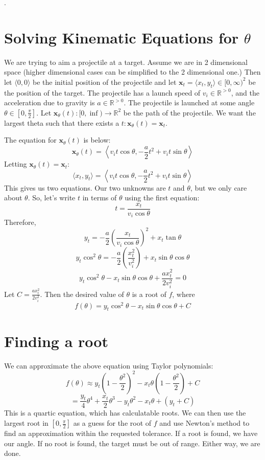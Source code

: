 \documentclass{report}
\begin{document}
.
	\section*{Solving Kinematic Equations for $\theta$}
	
	We are trying to aim a projectile at a target. Assume we are in 2 dimensional space (higher dimensional cases can be simplified to the 2 dimensional one.) Then let $\langle 0, 0\rangle$ be the initial position of the projectile and let $\mathbf x_t = \langle x_t, y_t\rangle\in\mathbb [0, \infty)^2$ be the position of the target. The projectile has a launch speed of $v_i\in\mathbb R^{>0}$, and the acceleration due to gravity is $a\in\mathbb R^{> 0}$. The projectile is launched at some angle $\theta \in \left[0, \frac \pi 2\right]$. Let $\mathbf x_\theta(t): [0, \inf) \to \mathbb R^2$ be the path of the projectile. We want the largest theta such that there exists a $t: \mathbf x_\theta(t) = \mathbf x_t$.
	
	The equation for $\mathbf x_\theta(t)$ is below:
	$$\mathbf x_\theta(t) =  \left\langle v_it \cos\theta,-\frac a 2 t^2 + v_i t \sin\theta\right\rangle$$
	Letting $\mathbf x_\theta(t) = \mathbf x_t$:
	$$\langle x_t, y_t\rangle =  \left\langle v_it \cos\theta,-\frac a 2 t^2 + v_i t \sin\theta\right\rangle$$
	This gives us two equations. Our two unknowns are $t$ and $\theta$, but we only care about $\theta$. So, let's write $t$ in terms of $\theta$ using the first equation:
	$$t = \frac {x_t}{v_i \cos\theta}$$
	Therefore, 
	$$y_t = -\frac a 2 \left(\frac {x_t} {v_i \cos \theta}\right)^2 + x_t \tan\theta$$
	$$y_t \cos^2\theta= -\frac a 2 \left(\frac {x_t ^2} {v_i ^2}\right) + x_t \sin\theta\cos\theta$$
	$$y_t\cos^2\theta - x_t\sin\theta\cos\theta + \frac {ax_t^2}{2v_i^2} = 0$$
	Let $C = \frac{ax_t^2}{2v_i^2}$. Then the desired value of $\theta$ is a root of $f$, where 
	$$f(\theta) = y_t\cos^2\theta-x_t\sin\theta\cos\theta + C$$
	
	\section*{Finding a root}
	We can approximate the above equation using Taylor polynomials:
	$$f(\theta) \approx y_t\left(1-\frac {\theta^2}2\right)^2 - x_t\theta\left(1-\frac{\theta^2}2\right)+C$$
	$$=\frac{y_t} 4 \theta^4 + \frac{x_t}{2}\theta^3 - y_t\theta^2 - x_t\theta+(y_t+C)$$
	This is a quartic equation, which has calculatable roots. We can then use the largest root in $\left[0, \frac\pi 2\right]$ as a guess for the root of $f$ and use Newton's method to find an approximation within the requested tolerance. If a root is found, we have our angle. If no root is found, the target must be out of range. Either way, we are done.
\end{document}
